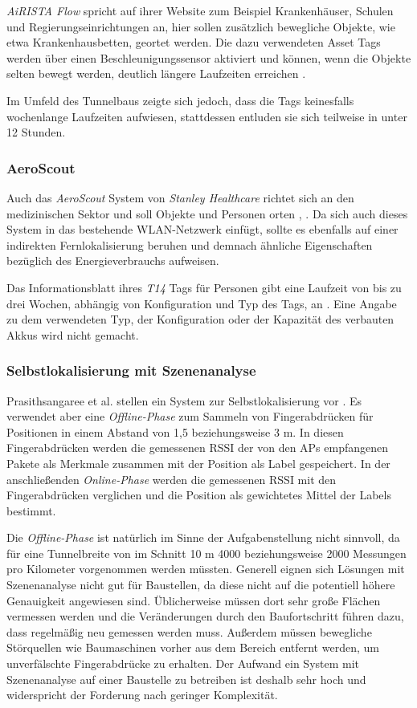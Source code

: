 \emph{AiRISTA Flow} spricht auf ihrer Website zum Beispiel Krankenhäuser, Schulen und Regierungseinrichtungen an, hier sollen zusätzlich bewegliche Objekte, wie etwa Krankenhausbetten, geortet werden.
Die dazu verwendeten Asset Tags werden über einen Beschleunigungssensor aktiviert und können, wenn die Objekte selten bewegt werden, deutlich längere Laufzeiten erreichen \cite{ekahau2017a4}. 

Im Umfeld des Tunnelbaus zeigte sich jedoch, dass die Tags keinesfalls wochenlange Laufzeiten aufwiesen, stattdessen entluden sie sich teilweise in unter 12 Stunden.

\subsubsection{AeroScout}
Auch das \emph{AeroScout} System von \emph{Stanley Healthcare} richtet sich an den medizinischen Sektor und soll Objekte und Personen orten \cite{aeroscout2017asset}, \cite{aeroscout2017staff}.
Da sich auch dieses System in das bestehende WLAN-Netzwerk einfügt, sollte es ebenfalls auf einer indirekten Fernlokalisierung beruhen und demnach ähnliche Eigenschaften bezüglich des Energieverbrauchs aufweisen.

Das Informationsblatt ihres \emph{T14} Tags für Personen gibt eine Laufzeit von bis zu drei Wochen, abhängig von Konfiguration und Typ des Tags, an \cite{aeroscout2017t14}. 
Eine Angabe zu dem verwendeten Typ, der Konfiguration oder der Kapazität des verbauten Akkus wird nicht gemacht.

\subsubsection{Selbstlokalisierung mit Szenenanalyse}
\label{ch:Vorherige:sec:RSS-basierte}
Prasithsangaree et al. stellen ein System zur Selbstlokalisierung vor \cite{prasithsangaree2002indoor}. 
Es verwendet aber eine \emph{Offline-Phase} zum Sammeln von Fingerabdrücken für Positionen in einem Abstand von 1,5 beziehungsweise 3 m. 
In diesen Fingerabdrücken werden die gemessenen RSSI der von den APs empfangenen Pakete als Merkmale zusammen mit der Position als Label gespeichert.
In der anschließenden \emph{Online-Phase} werden die gemessenen RSSI mit den Fingerabdrücken verglichen und die Position als gewichtetes Mittel der Labels bestimmt. 

Die \emph{Offline-Phase} ist natürlich im Sinne der Aufgabenstellung nicht sinnvoll, da für eine Tunnelbreite von im Schnitt 10 m 4000 beziehungsweise 2000 Messungen pro Kilometer vorgenommen werden müssten.
Generell eignen sich Lösungen mit Szenenanalyse nicht gut für Baustellen, da diese nicht auf die potentiell höhere Genauigkeit angewiesen sind. 
Üblicherweise müssen dort sehr große Flächen vermessen werden und die Veränderungen durch den Baufortschritt führen dazu, dass regelmäßig neu gemessen werden muss.
Außerdem müssen bewegliche Störquellen wie Baumaschinen vorher aus dem Bereich entfernt werden, um unverfälschte Fingerabdrücke zu erhalten.
Der Aufwand ein System mit Szenenanalyse auf einer Baustelle zu betreiben ist deshalb sehr hoch und widerspricht der Forderung nach geringer Komplexität. 

